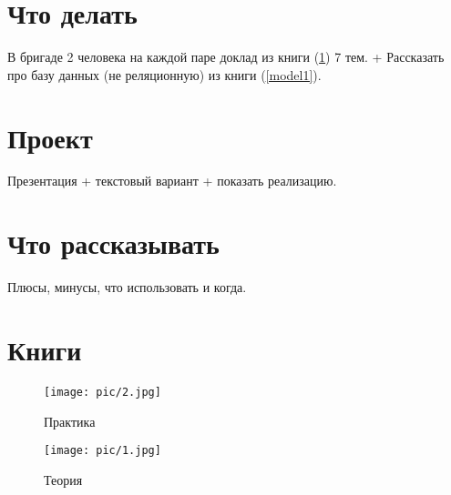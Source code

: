 \documentclass{article}
\begin{document}
%
\tableofcontents
\newpage

\section{Что делать}
В бригаде 2 человека на каждой паре доклад из книги (\ref{model2}) 7 тем.
+ Рассказать про базу данных (не реляционную) из книги (\ref{model1}). 

\section{Проект}
Презентация + текстовый вариант + показать реализацию.

\section{Что рассказывать}
Плюсы, минусы, что использовать и когда.

\section{Книги}
\begin{figure}[h]
    \centering
    \begin{minipage}{0.3\textwidth}
        \texttt{[image: pic/2.jpg]}
        \caption{Практика}
        \label{model1}
    \end{minipage}
    \hfill
    \begin{minipage}{0.3\textwidth}
        \texttt{[image: pic/1.jpg]}
        \caption{Теория}
        \label{model2}
    \end{minipage}
    \hfill
\end{figure}
\end{document}
